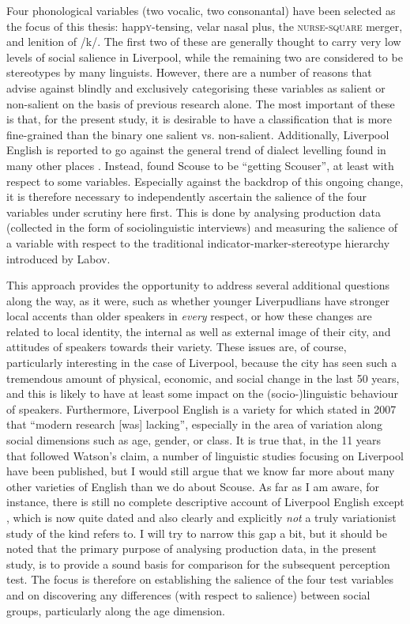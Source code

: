Four phonological variables (two vocalic, two consonantal) have been selected as the focus of this thesis: happ\textsc{y}-tensing, velar nasal plus, the \textsc{nurse}-\textsc{square} merger, and lenition of /k/.
The first two of these are generally thought to carry very low levels of social salience in Liverpool, while the remaining two are considered to be stereotypes by many linguists.
However, there are a number of reasons that advise against blindly and exclusively categorising these variables as salient or non-salient on the basis of previous research alone.
The most important of these is that, for the present study, it is desirable to have a classification that is more fine-grained than the binary one salient vs. non-salient.
Additionally, Liverpool English is reported to go against the general trend of dialect levelling found in many other places \parencite{kerswill2003}.
Instead, \textcite[237]{watson2007a} found Scouse to be ``getting Scouser'', at least with respect to some variables.
Especially against the backdrop of this ongoing change, it is therefore necessary to independently ascertain the salience of the four variables under scrutiny here first.
This is done by analysing production data (collected in the form of sociolinguistic interviews) and measuring the salience of a variable with respect to the traditional indicator-marker-stereotype hierarchy introduced by Labov.

This approach provides the opportunity to address several additional questions along the way, as it were, such as whether younger Liverpudlians have stronger local accents than older speakers in \emph{every} respect, or how these changes are related to local identity, the internal as well as external image of their city, and attitudes of speakers towards their variety.
These issues are, of course, particularly interesting in the case of Liverpool, because the city has seen such a tremendous amount of physical, economic, and social change in the last 50 years, and this is likely to have at least some impact on the (socio-)linguistic behaviour of speakers.
Furthermore, Liverpool English is a variety for which \textcite[351]{watson2007} stated in 2007 that ``modern research [was] lacking'', especially in the area of variation along social dimensions such as age, gender, or class.
It is true that, in the 11 years that followed Watson's claim, a number of linguistic studies focusing on Liverpool have been published, but I would still argue that we know far more about many other varieties of English than we do about Scouse.
As far as I am aware, for instance, there is still no complete descriptive account of Liverpool English except \cite{knowles1973}, which is now quite dated and also clearly and explicitly \emph{not} a truly variationist study of the kind \citeauthor{watson2007} refers to.
I will try to narrow this gap a bit, but it should be noted that the primary purpose of analysing production data, in the present study, is to provide a sound basis for comparison for the subsequent perception test.
The focus is therefore on establishing the salience of the four test variables and on discovering any differences (with respect to salience) between social groups, particularly along the age dimension.

